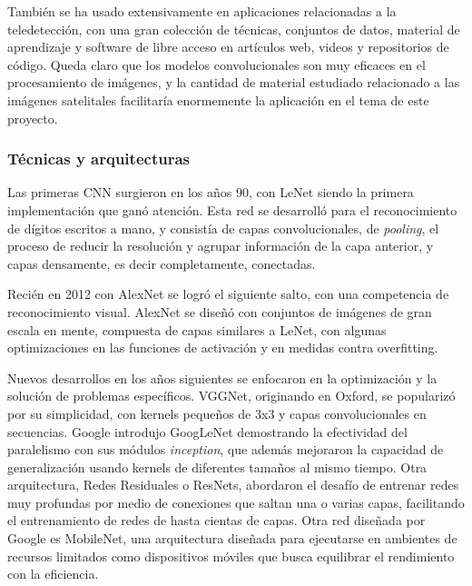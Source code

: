 También se ha usado extensivamente en aplicaciones relacionadas a la teledetección, con una gran colección de técnicas,
conjuntos de datos, material de aprendizaje y software de libre acceso en artículos web, videos y repositorios de
código. \autocite{tds-landuse-classification} \autocite{repo-satellite-image-dl} Queda claro que los modelos
convolucionales son muy eficaces en el procesamiento de imágenes, y la cantidad de material estudiado relacionado a las
imágenes satelitales facilitaría enormemente la aplicación en el tema de este proyecto.

\subsubsection{Técnicas y arquitecturas}

Las primeras CNN surgieron en los años 90, con LeNet siendo la primera implementación que ganó atención. Esta red se
desarrolló para el reconocimiento de dígitos escritos a mano, y consistía de capas convolucionales, de {\it pooling},
el proceso de reducir la resolución y agrupar información de la capa anterior, y capas densamente, es decir
completamente, conectadas.

Recién en 2012 con AlexNet se logró el siguiente salto, con una competencia de reconocimiento visual. AlexNet se diseñó
con conjuntos de imágenes de gran escala en mente, compuesta de capas similares a LeNet, con algunas optimizaciones en
las funciones de activación y en medidas contra overfitting.

Nuevos desarrollos en los años siguientes se enfocaron en la optimización y la solución de problemas específicos.
VGGNet, originando en Oxford, se popularizó por su simplicidad, con kernels pequeños de 3x3 y capas convolucionales en
secuencias. Google introdujo GoogLeNet demostrando la efectividad del paralelismo con sus módulos {\it inception}, que
además mejoraron la capacidad de generalización usando kernels de diferentes tamaños al mismo tiempo. Otra
arquitectura, Redes Residuales o ResNets, abordaron el desafío de entrenar redes muy profundas por medio de conexiones
que saltan una o varias capas, facilitando el entrenamiento de redes de hasta cientas de capas. Otra red diseñada por
Google es MobileNet, una arquitectura diseñada para ejecutarse en ambientes de recursos limitados como dispositivos
móviles que busca equilibrar el rendimiento con la eficiencia.

